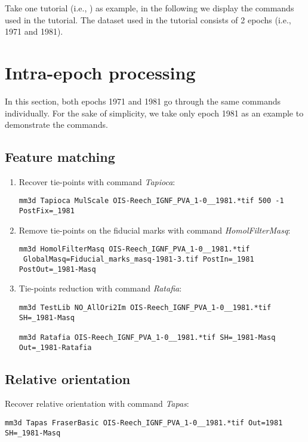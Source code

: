 Take one tutorial (i.e., \cite{tuto-aerial}) as example, in the following we display the commands used in the tutorial. The dataset used in the tutorial consists of 2 epochs (i.e., 1971 and 1981).

\section{Intra-epoch processing}
In this section, both epochs 1971 and 1981 go through the same commands individually. For the sake of simplicity, we take only epoch 1981 as an example to demonstrate the commands.\\
\subsection{Feature matching}

\begin{enumerate}
\item{Recover tie-points with command \textit{Tapioca}:}

\begin{verbatim}
mm3d Tapioca MulScale OIS-Reech_IGNF_PVA_1-0__1981.*tif 500 -1 PostFix=_1981
\end{verbatim}

\item{Remove tie-points on the fiducial marks with command \textit{HomolFilterMasq}:}
\begin{verbatim}
mm3d HomolFilterMasq OIS-Reech_IGNF_PVA_1-0__1981.*tif
 GlobalMasq=Fiducial_marks_masq-1981-3.tif PostIn=_1981 PostOut=_1981-Masq
\end{verbatim}

\item{Tie-points reduction with command \textit{Ratafia}:}
\begin{verbatim}
mm3d TestLib NO_AllOri2Im OIS-Reech_IGNF_PVA_1-0__1981.*tif SH=_1981-Masq

mm3d Ratafia OIS-Reech_IGNF_PVA_1-0__1981.*tif SH=_1981-Masq Out=_1981-Ratafia
\end{verbatim}
\end{enumerate}

\subsection{Relative orientation}
Recover relative orientation with command \textit{Tapas}:\\
\begin{verbatim}
mm3d Tapas FraserBasic OIS-Reech_IGNF_PVA_1-0__1981.*tif Out=1981 SH=_1981-Masq
\end{verbatim}

